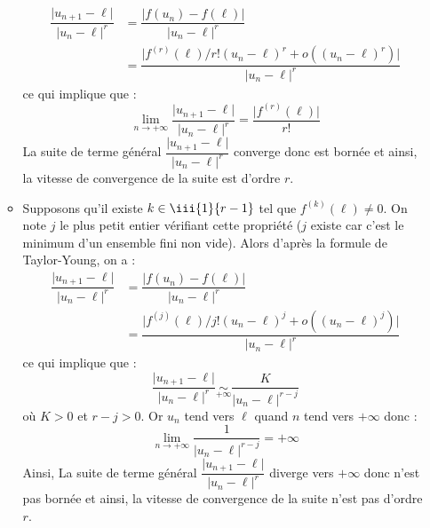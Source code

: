 \documentclass[a4paper,twoside,french,10pt]{VcCours}
\begin{document}
\begin{enumerate}
\begin{itemize}
  \begin{align*}
  \dfrac{\vert u_{n+1}- \ell \vert }{\vert u_n - \ell \vert^r} & = \dfrac{\vert f(u_n)- f(\ell) \vert }{\vert u_n - \ell \vert^r} \\
  & = \dfrac{\vert f^{(r)}(\ell)/r!  (u_n- \ell)^r +o ((u_n- \ell)^r  )\vert}{\vert u_n - \ell \vert^r} 
  \end{align*}
  ce qui implique que :
  $$ \lim_{n \rightarrow + \infty}  \dfrac{\vert u_{n+1}- \ell \vert }{\vert u_n - \ell \vert^r} = \dfrac{\vert f^{(r)}(\ell) \vert}{r!}$$
  La suite de terme général  $\dfrac{\vert u_{n+1}- \ell \vert }{\vert u_n - \ell \vert^r}$ converge donc est bornée et ainsi, la vitesse de convergence de la suite est d'ordre $r$.
  \item Supposons qu'il existe $k  \in \iii{1}{r-1}$ tel que $f^{(k)}(\ell) \neq 0$. On note $j$ le plus petit entier vérifiant cette propriété ($j$ existe car c'est le minimum d'un ensemble fini non vide). Alors d'après la formule de Taylor-Young, on a :
   \begin{align*}
  \dfrac{\vert u_{n+1}- \ell \vert }{\vert u_n - \ell \vert^r} &= \dfrac{\vert f(u_n)- f(\ell) \vert }{\vert u_n - \ell \vert^r} \\ 
   & = \dfrac{\vert f^{(j)}(\ell)/j!  (u_n- \ell)^j +o ((u_n- \ell)^j  )\vert}{\vert u_n - \ell \vert^r} 
   \end{align*}
   ce qui implique que :
$$   \dfrac{\vert u_{n+1}- \ell \vert }{\vert u_n - \ell \vert^r} \underset{+ \infty}{\sim} \dfrac{K}{\vert u_n - \ell \vert^{r-j}}$$
où $K>0$ et $r-j>0$. Or $u_n$ tend vers $\ell$ quand $n$ tend vers $+ \infty$ donc :
$$ \lim_{n \rightarrow + \infty}\dfrac{1}{\vert u_n - \ell \vert^{r-j}} = + \infty$$
Ainsi, La suite de terme général  $\dfrac{\vert u_{n+1}- \ell \vert }{\vert u_n - \ell \vert^r}$ diverge vers $+ \infty$ donc n'est pas bornée et ainsi, la vitesse de convergence de la suite n'est pas d'ordre $r$.
  \end{itemize}
\end{enumerate}
\end{document}
